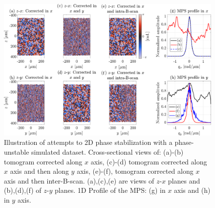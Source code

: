 \begin{figure}[htb!]
	\centering
	\includegraphics[width=\textwidth]{Figures/SHARP/PhaseStabilization/PhaseStabiliaztion2D.pdf}
	\caption[Illustration of attempts to 2D phase stabilization with a phase-unstable simulated dataset.]{Illustration of attempts to 2D phase stabilization with a phase-unstable simulated dataset. Cross-sectional views of: (a)-(b) tomogram corrected along $x$ axis, (c)-(d) tomogram corrected along $x$ axis and then along $y$ axis, (e)-(f), tomogram corrected along $x$ axis and then inter-B-scan. (a),(c),(e) are views of $z$-$x$ planes and (b),(d),(f) of $z$-$y$ planes. 1D Profile of the MPS: (g) in $x$ axis and (h) in $y$ axis.}
	\label{fig:PhaseStable2D}
\end{figure}

